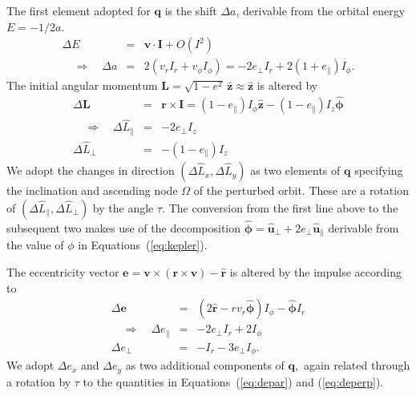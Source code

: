 \documentclass[linenumbers, onecolumn]{aastex631}
\newcommand{\vecI}{\mathbf{I}}
\newcommand{\vece}{\mathbf{e}}
\newcommand{\rhat}{\mathbf{\hat r}}
\newcommand{\phat}{\boldsymbol{\hat\phi}}
\newcommand{\uhat}{\boldsymbol{\hat u}}
\newcommand{\zhat}{\mathbf{\hat z}}
\newcommand{\vecq}{\mathbf{q}}
\newcommand{\vecr}{\mathbf{r}}
\newcommand{\vecv}{\mathbf{v}}
\newcommand{\Lhat}{\hat L}
\begin{document}
The first element adopted for $\vecq$ is the shift $\Delta a$, derivable from the orbital energy $E=-1/2a.$
\begin{eqnarray}
  \Delta E & = &  \vecv \cdot \vecI + O(I^2) \\
  \quad \Rightarrow \quad \Delta a & = & 2\left(v_r I_r + v_\phi I_\phi\right) = -2e_\perp I_r + 2(1+e_\parallel) I_\phi.
  \label{eq:da}
\end{eqnarray}
The initial angular momentum $\mathbf{L} = \sqrt{1-e^2}\,\zhat \approx \zhat$ is altered by
\begin{eqnarray}
  \Delta \mathbf{L} & = & \vecr \times \vecI = (1-e_\parallel) I_\phi \zhat - (1-e_\parallel) I_z \phat \\
  \quad \Rightarrow \quad \Delta \Lhat_\parallel & = & -2e_\perp I_z
  \label{eq:dLpar}\\
  \Delta \Lhat_\perp & = & -(1-e_\parallel)  I_z
                  \label{eq:dLperp}
\end{eqnarray}
We adopt the changes in direction $(\Delta\Lhat_x, \Delta\Lhat_y)$ as two elements of $\vecq$ specifying the inclination and ascending node $\Omega$ of the perturbed orbit.  These are a rotation of $(\Delta\Lhat_\parallel, \Delta\Lhat_\perp)$ by the angle $\tau.$  The conversion from the first line above to the subsequent two makes use of the decomposition $\phat=\uhat_\perp + 2e_\perp \uhat_\parallel$ derivable from the value of $\phi$ in Equations~(\ref{eq:kepler}).

The eccentricity vector $\vece = \vecv \times (\vecr \times \vecv) - \rhat$ is altered by the impulse according to
\begin{eqnarray}
  \Delta\vece & = & (2\rhat - rv_r \phat) I_\phi - \phat I_r \\
\label{eq:depar}
  \quad \Rightarrow \quad \Delta e_\parallel & = &  -2e_\perp I_r + 2 I_\phi \\
\Delta e_\perp & = & -I_r - 3e_\perp I_\phi.
\label{eq:deperp}
\end{eqnarray}
We adopt $\Delta e_x$ and $\Delta e_y$ as two additional components of $\vecq,$ again related through a rotation by $\tau$ to the quantities in Equations~(\ref{eq:depar}) and (\ref{eq:deperp}).
\end{document}
